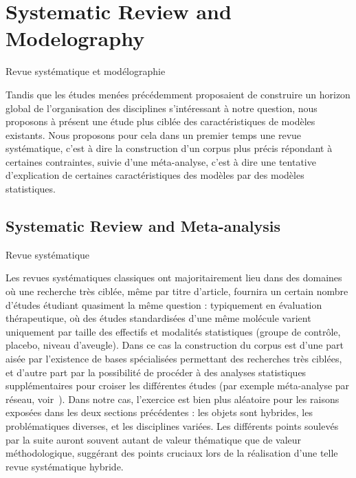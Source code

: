 



\newpage

\section{Systematic Review and Modelography}{Revue systématique et modélographie}

\label{sec:modelography}



Tandis que les études menées précédemment proposaient de construire un horizon global de l'organisation des disciplines s'intéressant à notre question, nous proposons à présent une étude plus ciblée des caractéristiques de modèles existants. Nous proposons pour cela dans un premier temps une revue systématique, c'est à dire la construction d'un corpus plus précis répondant à certaines contraintes, suivie d'une méta-analyse, c'est à dire une tentative d'explication de certaines caractéristiques des modèles par des modèles statistiques.


\subsection{Systematic Review and Meta-analysis}{Revue systématique}



Les revues systématiques classiques ont majoritairement lieu dans des domaines où une recherche très ciblée, même par titre d'article, fournira un certain nombre d'études étudiant quasiment la même question : typiquement en évaluation thérapeutique, où des études standardisées d'une même molécule varient uniquement par taille des effectifs et modalités statistiques (groupe de contrôle, placebo, niveau d'aveugle). Dans ce cas la construction du corpus est d'une part aisée par l'existence de bases spécialisées permettant des recherches très ciblées, et d'autre part par la possibilité de procéder à des analyses statistiques supplémentaires pour croiser les différentes études (par exemple méta-analyse par réseau, voir~\cite{rucker2012network}). Dans notre cas, l'exercice est bien plus aléatoire pour les raisons exposées dans les deux sections précédentes : les objets sont hybrides, les problématiques diverses, et les disciplines variées. Les différents points soulevés par la suite auront souvent autant de valeur thématique que de valeur méthodologique, suggérant des points cruciaux lors de la réalisation d'une telle revue systématique hybride.


